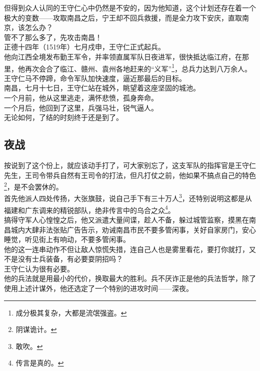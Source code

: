 \begin{multicols}{\theparacolNo}
但得到众人认同的王守仁心中仍然是不安的，因为他知道，这个计划还存在着一个极大的变数——攻取南昌之后，宁王却不回兵救援，而是全力攻下安庆，直取南京，该怎么办？\\

管不了那么多了，先攻击南昌！\\

正德十四年（1519年）七月戍申，王守仁正式起兵。\\

他向江西全境发布勤王军令，并率领直属军队日夜进军，很快抵达临江府，在那里，他再次会合了临江、赣州、袁州各地赶来的“义军”\footnote{成分极其复杂，大都是流氓强盗。}，总兵力达到八万余人。王守仁马不停蹄，命令军队加快速度，逼近那最后的目标。\\

南昌，七月十七日，王守仁站在城外，眺望着这座坚固的城池。\\

一个月前，他从这里逃走，满怀悲愤，孤身奔命。\\

一个月后，他回到了这里，兵强马壮，锐气逼人。\\

无论如何，了结的时刻终于还是到了。\\

\subsection{夜战}
按说到了这个份上，就应该动手打了，可大家别忘了，这支军队的指挥官是王守仁先生，王司令带兵自然有王司令的打法，但凡打仗之前，他如果不搞点自己的特色\footnote{阴谋诡计。}，是不会罢休的。\\

首先他派人四处传扬，大张旗鼓，说自己手下有三十万人\footnote{敢吹。}，还特别说明这都是从福建和广东调来的精锐部队，绝非传言中的乌合之众\footnote{传言是真的。}。\\

搞得守军人心惶惶之后，他又派遣大量间谍，趁人不备，躲过城管监察，摸黑在南昌城内大肆非法张贴广告告示，劝诫南昌市民不要多管闲事，关好自家房门，安心睡觉，听见街上有响动，不要多管闲事。\\

他的这一连串动作不但让敌人惊慌失措，连自己人也是雾里看花，要打你就打，又不是没有士兵装备，有必要耍阴招吗？\\

王守仁认为很有必要。\\

他的兵法就是用最小的代价，换取最大的胜利。兵不厌诈正是他的兵法哲学，除了使用上述计谋外，他还选定了一个特别的进攻时间——深夜。\\


\end{multicols}
